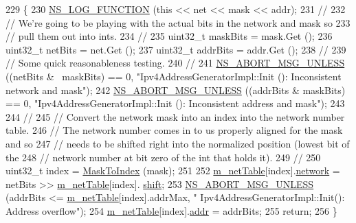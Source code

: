 \begin{DoxyCode}
229 \{
230   \hyperlink{log-macros-disabled_8h_a90b90d5bad1f39cb1b64923ea94c0761}{NS\_LOG\_FUNCTION} (\textcolor{keyword}{this} << net << mask << addr);
231 \textcolor{comment}{//}
232 \textcolor{comment}{// We're going to be playing with the actual bits in the network and mask so}
233 \textcolor{comment}{// pull them out into ints.}
234 \textcolor{comment}{//}
235   uint32\_t maskBits = mask.Get ();
236   uint32\_t netBits = net.Get ();
237   uint32\_t addrBits = addr.Get ();
238 \textcolor{comment}{//}
239 \textcolor{comment}{// Some quick reasonableness testing.}
240 \textcolor{comment}{//}
241   \hyperlink{group__fatal_ga0bd3f62c55e7347ff814572f3aaa3864}{NS\_ABORT\_MSG\_UNLESS} ((netBits & ~maskBits) == 0, \textcolor{stringliteral}{"Ipv4AddressGeneratorImpl::Init ():
       Inconsistent network and mask"});
242   \hyperlink{group__fatal_ga0bd3f62c55e7347ff814572f3aaa3864}{NS\_ABORT\_MSG\_UNLESS} ((addrBits & maskBits) == 0, \textcolor{stringliteral}{"Ipv4AddressGeneratorImpl::Init ():
       Inconsistent address and mask"});
243 
244 \textcolor{comment}{//}
245 \textcolor{comment}{// Convert the network mask into an index into the network number table.}
246 \textcolor{comment}{// The network number comes in to us properly aligned for the mask and so}
247 \textcolor{comment}{// needs to be shifted right into the normalized position (lowest bit of the}
248 \textcolor{comment}{// network number at bit zero of the int that holds it).}
249 \textcolor{comment}{//}
250   uint32\_t index = \hyperlink{classns3_1_1Ipv4AddressGeneratorImpl_a5049d4c03ccdeb1fcce7ab50baf23a86}{MaskToIndex} (mask);
251 
252   \hyperlink{classns3_1_1Ipv4AddressGeneratorImpl_a9cdf3f8008d6e9d7ce32272db4d6dcc9}{m\_netTable}[index].\hyperlink{classns3_1_1Ipv4AddressGeneratorImpl_1_1NetworkState_afe15739547ef60d7ba74c3ab6b83e6f8}{network} = netBits >> \hyperlink{classns3_1_1Ipv4AddressGeneratorImpl_a9cdf3f8008d6e9d7ce32272db4d6dcc9}{m\_netTable}[index].
      \hyperlink{classns3_1_1Ipv4AddressGeneratorImpl_1_1NetworkState_a2cc2b6173f3cb653762ea92dc986cf2c}{shift};
253   \hyperlink{group__fatal_ga0bd3f62c55e7347ff814572f3aaa3864}{NS\_ABORT\_MSG\_UNLESS} (addrBits <= \hyperlink{classns3_1_1Ipv4AddressGeneratorImpl_a9cdf3f8008d6e9d7ce32272db4d6dcc9}{m\_netTable}[index].addrMax, \textcolor{stringliteral}{"
      Ipv4AddressGeneratorImpl::Init(): Address overflow"});
254   \hyperlink{classns3_1_1Ipv4AddressGeneratorImpl_a9cdf3f8008d6e9d7ce32272db4d6dcc9}{m\_netTable}[index].\hyperlink{classns3_1_1Ipv4AddressGeneratorImpl_1_1NetworkState_a9ef9d11050694760071d58b72659a7a3}{addr} = addrBits;
255   \textcolor{keywordflow}{return};
256 \}
\end{DoxyCode}


